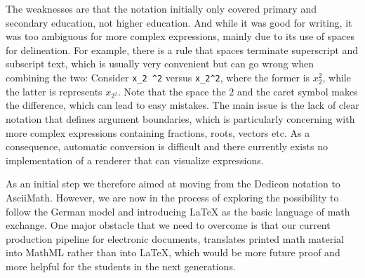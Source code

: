 \documentclass{article}
\begin{document}
The weaknesses are that the notation initially only covered primary and
secondary education, not higher education. And while it was good for writing, it
was too ambiguous for more complex expressions, mainly due to its use of spaces
for delineation. For example, there is a rule that spaces terminate superscript
and subscript text, which is usually very convenient but can go wrong when
combining the two: Consider \verb+x_2 ^2+ versus \verb+x_2^2+, where the former
is $x_2^2$, while the latter is represents $x_{2^2}$. Note that the space the
$2$ and the caret symbol makes the difference, which can lead to easy mistakes.
The main issue is the lack of clear notation that defines argument boundaries,
which is particularly concerning with more complex expressions containing
fractions, roots, vectors etc.  As a consequence, automatic conversion is
difficult and there currently exists no implementation of a renderer that can
visualize expressions.

As an initial step we therefore aimed at moving from the Dedicon notation to
AsciiMath. However, we are now in the process of exploring the possibility to
follow the German model and introducing {\LaTeX} as the basic language of math
exchange.  One major obstacle that we need to overcome is that our current
production pipeline for electronic documents, translates printed math material
into MathML rather than into {\LaTeX}, which would be more future proof and more
helpful for the students in the next generations.



\end{document}
